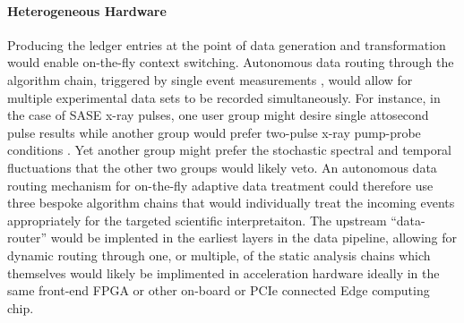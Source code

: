 \documentclass{article}
\begin{document}
\paragraph{Heterogeneous Hardware}
Producing the ledger entries at the point of data generation and transformation would enable on-the-fly context switching.
Autonomous data routing through the algorithm chain, triggered by single event measurements \cite{Lutman2016,Wolfi2017_review,Hartmann2018}, would allow for multiple experimental data sets to be recorded simultaneously.  
For instance, in the case of SASE x-ray pulses, one user group might desire single attosecond pulse results \cite{Cryan2016_impulsive} while another group would prefer two-pulse x-ray pump-probe conditions \cite{Hartmann2018}.  
Yet another group might prefer the stochastic spectral and temporal fluctuations \cite{Feurer2018,IanRobinson2018,Driver2019_spooktroscopy} that the other two groups would likely veto.  
An autonomous data routing mechanism for on-the-fly adaptive data treatment could therefore use three bespoke algorithm chains that would individually treat the incoming events appropriately for the targeted scientific interpretaiton.
The upstream ``data-router'' \cite{Audrey} would be implented in the earliest layers in the data pipeline, allowing for dynamic routing through one, or multiple, of the static analysis chains which themselves would likely be implimented in acceleration hardware ideally in the same front-end FPGA or other on-board or PCIe connected Edge computing chip.
\end{document}
